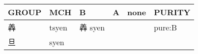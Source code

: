 \documentclass[14pt,a4paper]{scrartcl}
\begin{document}
\begin{longtable}[c]{@{}llllll@{}}
\toprule
\begin{minipage}[b]{0.14\columnwidth}\raggedright\strut
GROUP
\strut\end{minipage} &
\begin{minipage}[b]{0.14\columnwidth}\raggedright\strut
MCH
\strut\end{minipage} &
\begin{minipage}[b]{0.14\columnwidth}\raggedright\strut
B
\strut\end{minipage} &
\begin{minipage}[b]{0.14\columnwidth}\raggedright\strut
A
\strut\end{minipage} &
\begin{minipage}[b]{0.14\columnwidth}\raggedright\strut
none
\strut\end{minipage} &
\begin{minipage}[b]{0.14\columnwidth}\raggedright\strut
PURITY
\strut\end{minipage}\tabularnewline
\midrule
\endhead
\begin{minipage}[t]{0.14\columnwidth}\raggedright\strut
羴
\strut\end{minipage} &
\begin{minipage}[t]{0.14\columnwidth}\raggedright\strut
tsyen
\strut\end{minipage} &
\begin{minipage}[t]{0.14\columnwidth}\raggedright\strut
羴 syen
\strut\end{minipage} &
\begin{minipage}[t]{0.14\columnwidth}\raggedright\strut
\strut\end{minipage} &
\begin{minipage}[t]{0.14\columnwidth}\raggedright\strut
\strut\end{minipage} &
\begin{minipage}[t]{0.14\columnwidth}\raggedright\strut
pure:B
\strut\end{minipage}\tabularnewline
\begin{minipage}[t]{0.14\columnwidth}\raggedright\strut
旦
\strut\end{minipage} &
\begin{minipage}[t]{0.14\columnwidth}\raggedright\strut
syen
\strut\end{minipage} &
\begin{minipage}[t]{0.14\columnwidth}\raggedright\strut
\strut\end{minipage} &
\begin{minipage}[t]{0.14\columnwidth}\raggedright\strut

\end{minipage}
\end{longtable}
\end{document}

